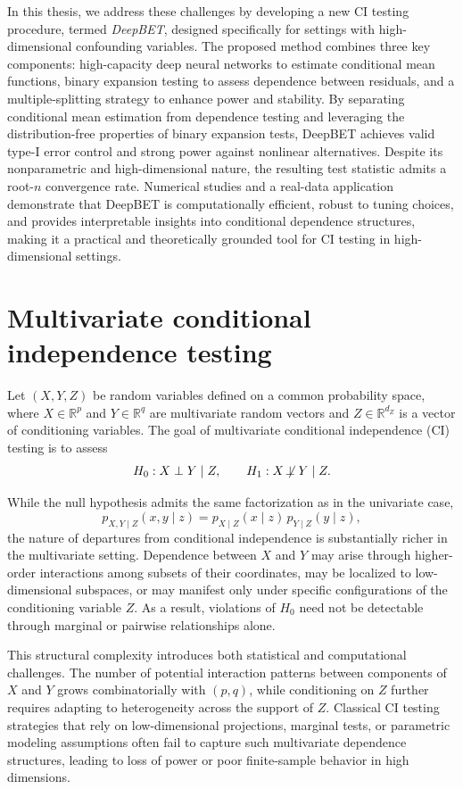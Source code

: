 \documentclass[12pt,reqno,oneside]{amsbook}
\theoremstyle{definition}
\theoremstyle{remark}
\begin{document}
In this thesis, we address these challenges by developing a new CI testing
procedure, termed \emph{DeepBET}, designed specifically for settings with
high-dimensional confounding variables. The proposed method combines three key
components: high-capacity deep neural networks to estimate conditional mean
functions, binary expansion testing to assess dependence between residuals, and
a multiple-splitting strategy to enhance power and stability. By separating
conditional mean estimation from dependence testing and leveraging the
distribution-free properties of binary expansion tests, DeepBET achieves valid
type-I error control and strong power against nonlinear alternatives. Despite
its nonparametric and high-dimensional nature, the resulting test statistic
admits a root-$n$ convergence rate. Numerical studies and a real-data application
demonstrate that DeepBET is computationally efficient, robust to tuning choices,
and provides interpretable insights into conditional dependence structures,
making it a practical and theoretically grounded tool for CI testing in
high-dimensional settings.

\section{Multivariate conditional independence testing}
\label{subsec:ci_multivariate_intro}

Let $(X,Y,Z)$ be random variables defined on a common probability space, where
$X\in\mathbb{R}^{p}$ and $Y\in\mathbb{R}^{q}$ are multivariate random vectors and
$Z\in\mathbb{R}^{d_Z}$ is a vector of conditioning variables. The goal of
multivariate conditional independence (CI) testing is to assess
\[
H_0:X\perp Y\mid Z,
\qquad
H_1:X\not\!\perp Y\mid Z.
\]

While the null hypothesis admits the same
factorization as in the univariate case,
\[
p_{X,Y\mid Z}(x,y\mid z)
=
p_{X\mid Z}(x\mid z)\,p_{Y\mid Z}(y\mid z),
\]
the nature of departures from conditional independence is substantially richer
in the multivariate setting. Dependence between $X$ and $Y$ may arise through
higher-order interactions among subsets of their coordinates, may be localized
to low-dimensional subspaces, or may manifest only under specific configurations
of the conditioning variable $Z$. As a result, violations of $H_0$ need not be
detectable through marginal or pairwise relationships alone.

This structural complexity introduces both statistical and computational
challenges. The number of potential interaction patterns between components of
$X$ and $Y$ grows combinatorially with $(p,q)$, while conditioning on $Z$ further
requires adapting to heterogeneity across the support of $Z$. Classical CI
testing strategies that rely on low-dimensional projections, marginal tests, or
parametric modeling assumptions often fail to capture such multivariate
dependence structures, leading to loss of power or poor finite-sample behavior
in high dimensions.
\end{document}
